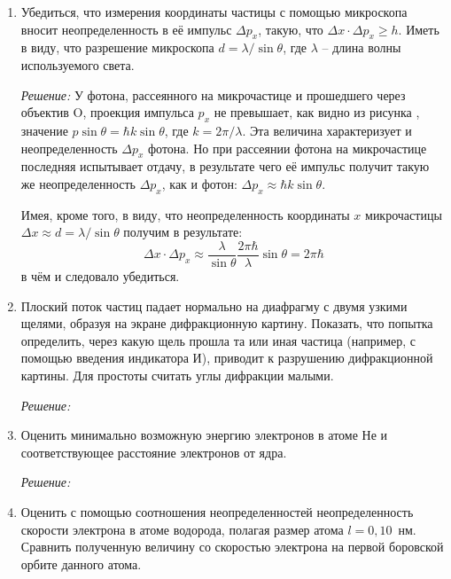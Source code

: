 \begin{enumerate}
\newpage

\item Убедиться, что измерения координаты частицы с помощью микроскопа вносит
неопределенность в её импульс \( \Delta p_x \), такую, что
\( \Delta x\cdot\Delta p_x \ge h \). Иметь в виду, что разрешение микроскопа
\( d = \lambda/\sin\theta \), где \( \lambda \) -- длина волны используемого
света.

\emph{Решение:}
    У фотона, рассеянного на микрочастице и прошедшего через объектив O,
    проекция импульса \( p_x \) не превышает, как видно из рисунка \smiley,
    значение \( p\sin\theta = \hbar k\sin\theta \), где \( k = 2\pi/\lambda \).
    Эта величина характеризует и неопределенность \( \Delta p_x \) фотона. Но
    при рассеянии фотона на микрочастице последняя испытывает отдачу, в
    результате чего её импульс получит такую же неопределенность \( \Delta p_x\),
    как и фотон: \( \Delta p_x \approx \hbar k\sin\theta \).

    Имея, кроме того, в виду, что неопределенность координаты \( x \)
    микрочастицы \( \Delta x \approx d = \lambda/\sin\theta \) получим в
    результате:
    \[ 
        \Delta x\cdot\Delta p_x \approx \frac{\lambda}{\sin\theta}
        \frac{2\pi\hbar}{\lambda}\sin\theta = 2\pi\hbar
    \]
    в чём и следовало убедиться.

\newpage

\item Плоский поток частиц падает нормально на диафрагму с двумя узкими щелями,
образуя на экране дифракционную картину. Показать, что попытка определить, через
какую щель прошла та или иная частица (например, с помощью введения индикатора
И), приводит к разрушению дифракционной картины. Для простоты считать углы
дифракции малыми.

\emph{Решение:}

\newpage

\item Оценить минимально возможную энергию электронов в атоме Не и
соответствующее расстояние электронов от ядра.

\emph{Решение:}

\newpage

\item Оценить с помощью соотношения неопределенностей неопределенность скорости
электрона в атоме водорода, полагая размер атома \( l = 0,\!10 \)~нм. Сравнить
полученную величину со скоростью электрона на первой боровской орбите данного
атома.


\end{enumerate}
